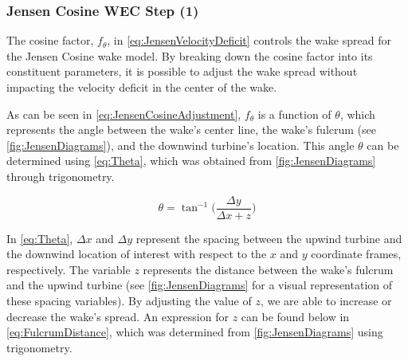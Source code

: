 \documentclass[a4paper]{jpconf}
\begin{document}

\subsubsection{Jensen Cosine WEC Step (1)}

The cosine factor, $f_\theta$, in \cref{eq:JensenVelocityDeficit} controls the wake spread for the Jensen Cosine wake model. By breaking down the cosine factor into its constituent parameters, it is possible to adjust the wake spread without impacting the velocity deficit in the center of the wake.


As can be seen in \cref{eq:JensenCosineAdjustment}, $f_\theta$ is a function of $\theta$, which represents the angle between the wake's center line, the wake's fulcrum (see \cref{fig:JensenDiagrams}), and the downwind turbine's location. This angle $\theta$ can be determined using \cref{eq:Theta}, which was obtained from \cref{fig:JensenDiagrams} through trigonometry.

\begin{equation}
\theta = \tan^{-1}\Big( \frac{\Delta y}{\Delta x + z} \Big)
\label{eq:Theta}
\end{equation}

In \cref{eq:Theta}, $\Delta x$ and $\Delta y$ represent the spacing between the upwind turbine and the downwind location of interest with respect to the $x$ and $y$ coordinate frames, respectively. The variable $z$ represents the distance between the wake's fulcrum and the upwind turbine (see \cref{fig:JensenDiagrams} for a visual representation of these spacing variables). By adjusting the value of $z$, we are able to increase or decrease the wake's spread. An expression for $z$ can be found below in \cref{eq:FulcrumDistance}, which was determined from \cref{fig:JensenDiagrams} using trigonometry.
\end{document}
